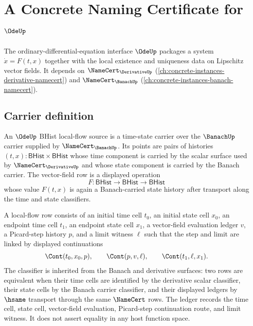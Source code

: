 \chapter{A Concrete Naming Certificate for $\OdeUp$}
\label{ch:concrete-instances-ode-namecert}

The ordinary-differential-equation interface $\OdeUp$ packages a system $\dot x = F(t, x)$ together with the local existence and uniqueness data on Lipschitz vector fields. It depends on $\NameCert_{\DerivativeUp}$ (\autoref{ch:concrete-instances-derivative-namecert}) and $\NameCert_{\BanachUp}$ (\autoref{ch:concrete-instances-banach-namecert}).

\section{Carrier definition}
\label{sec:ode-carrier}

\begin{definition}
\label{def:ode-bhist-local-flow-source}
An $\OdeUp$ BHist local-flow source is a time-state carrier over the
$\BanachUp$ carrier supplied by $\NameCert_{\BanachUp}$. Its points are pairs
of histories $(t,x):\mathsf{BHist}\times\mathsf{BHist}$ whose time component
is carried by the scalar surface used by $\NameCert_{\DerivativeUp}$ and whose
state component is carried by the Banach carrier. The vector-field row is a
displayed operation
$$
F:\mathsf{BHist}\to\mathsf{BHist}\to\mathsf{BHist}
$$
whose value $F(t,x)$ is again a Banach-carried state history after transport
along the time and state classifiers.

A local-flow row consists of an initial time cell $t_0$, an initial state cell
$x_0$, an endpoint time cell $t_1$, an endpoint state cell $x_1$, a
vector-field evaluation ledger $v$, a Picard-step history $p$, and a limit
witness $\ell$ such that the step and limit are linked by displayed
continuations
$$
\Cont(t_0,x_0,p),\qquad
\Cont(p,v,\ell),\qquad
\Cont(t_1,\ell,x_1).
$$
The classifier is inherited from the Banach and derivative surfaces: two rows
are equivalent when their time cells are identified by the derivative scalar
classifier, their state cells by the Banach carrier classifier, and their
displayed ledgers by $\hsame$ transport through the same $\NameCert$ rows.
The ledger records the time cell, state cell, vector-field evaluation,
Picard-step continuation route, and limit witness. It does not assert equality
in any host function space.
\end{definition}

